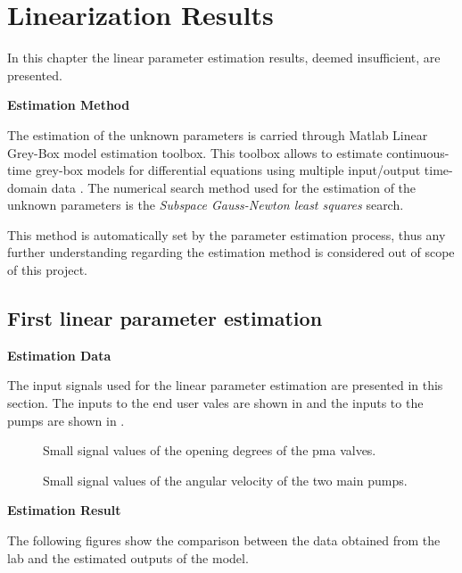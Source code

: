 \chapter{Linearization Results}
\label{LinResults_failed_attempts}
In this chapter the linear parameter estimation results, deemed insufficient, are presented.   

\textbf{Estimation Method}

The estimation of the unknown parameters is carried through Matlab Linear Grey-Box model estimation toolbox. This toolbox allows to estimate continuous-time 
grey-box models for differential equations using multiple input/output time-domain data \cite{LinearEstimation}.
The numerical search method used for the estimation of the unknown parameters is the \textit{Subspace Gauss-Newton least squares} search. 

This method is automatically set by the parameter estimation process, thus any further understanding regarding the estimation method is considered out of 
scope of this project. 

\section{First linear parameter estimation}
\label{LinResults_worst}
\textbf{Estimation Data}

The input signals used for the linear parameter estimation are presented in this section.  
The inputs to the end user vales are shown in  and the inputs to the pumps are shown in . 


\begin{figure}[H]
  \centering
  \begin{minipage}[b]{0.45\textwidth}
     
    \caption{Small signal values of the opening degrees of the pma valves. }
    \label{fig:est_OD_data_w}
  \end{minipage}
  \hfill
  \begin{minipage}[b]{0.45\textwidth}
     
    \caption{Small signal values of the angular velocity of the two main pumps.}
    \label{fig:est_deltap_data_w}
  \end{minipage}
\end{figure}


\textbf{Estimation Result}

The following figures show the comparison between the data obtained from the lab and the estimated outputs of the model.  

